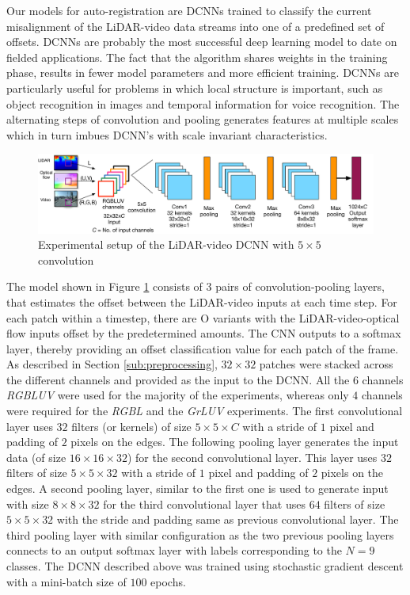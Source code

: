 \documentclass{article}
\begin{document}
Our models for auto-registration are DCNNs trained to classify the current misalignment of the LiDAR-video data streams into one of a predefined set of offsets. DCNNs are probably the most successful deep learning model to date on fielded applications. The fact that the algorithm shares weights in the training phase, results in fewer model parameters and more efficient training. DCNNs are particularly useful for problems in which local structure is important, such as object recognition in images and temporal information for voice recognition. The alternating steps of convolution and pooling generates features at multiple scales which in turn imbues DCNN's with scale invariant characteristics.

\begin{figure}[htbp]
    \centering
        \includegraphics[scale=0.42]{lidar_dcnn_setup2.pdf}
    \caption{Experimental setup of the LiDAR-video DCNN with $5\times5$ convolution}
    \label{fig:Figures_lidar_dcnn_setup1}
\end{figure}

The model shown in Figure \ref{fig:Figures_lidar_dcnn_setup1} consists of 3 pairs of convolution-pooling layers, that estimates the offset between the LiDAR-video inputs at each time step. For each patch within a timestep, there are O variants with the LiDAR-video-optical flow inputs offset by the predetermined amounts. The CNN outputs to a softmax layer, thereby providing an offset classification value for each patch of the frame. As described in Section \ref{sub:preprocessing}, $32\times32$ patches were stacked across the different channels and provided as the input to the DCNN. All the $6$ channels \emph{RGBLUV} were used for the majority of the experiments, whereas only $4$ channels were required for the \emph{RGBL} and the \emph{GrLUV} experiments. The first convolutional layer uses $32$ filters (or kernels) of size $5 \times 5 \times \mathit{C} $ with a stride of $1$ pixel and padding of $2$ pixels on the edges. The following pooling layer generates the input data (of size $16 \times 16 \times 32$) for the second convolutional layer. This layer uses $32$ filters of size $5 \times 5 \times 32$ with a stride of $1$ pixel and padding of $2$ pixels on the edges. A second pooling layer, similar to the first one is used to generate input with size $8 \times 8 \times 32$ for the third convolutional layer that uses $64$ filters of size $5 \times 5 \times 32$ with the stride and padding same as previous convolutional layer. The third pooling layer with similar configuration as the two previous pooling layers connects to an output softmax layer with labels corresponding to the $N=9$ classes. The DCNN described above was trained using stochastic gradient descent with a mini-batch size of $100$ epochs.
\end{document}
